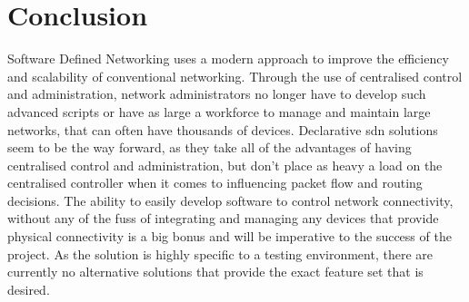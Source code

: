\section{Conclusion}
\label{litreview:conclusion}
Software Defined Networking uses a modern approach to
improve the efficiency and scalability of conventional networking. Through the
use of centralised control and administration, network administrators no longer
have to develop such advanced scripts or have as large a workforce to manage
and maintain large networks, that can often have thousands of devices.
Declarative \gls{sdn} solutions seem to be the way forward, as they take all of
the advantages of having centralised control and administration, but don't
place as heavy a load on the centralised controller when it comes to
influencing packet flow and routing decisions. The ability to easily develop
software to control network connectivity, without any of the fuss of
integrating and managing any devices that provide physical connectivity is a
big bonus and will be imperative to the success of the project. As the solution
is highly specific to a testing environment, there are currently no alternative
solutions that provide the exact feature set that is desired.